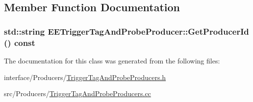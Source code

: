 \subsection{Member Function Documentation}
\hypertarget{classEETriggerTagAndProbeProducer_a57b0a6e9d0e859429865c17a679edd41}{
\subsubsection[{GetProducerId}]{\setlength{\rightskip}{0pt plus 5cm}std::string EETriggerTagAndProbeProducer::GetProducerId () const}}
\label{classEETriggerTagAndProbeProducer_a57b0a6e9d0e859429865c17a679edd41}


The documentation for this class was generated from the following files:\begin{DoxyCompactItemize}
\item 
interface/Producers/\hyperlink{TriggerTagAndProbeProducers_8h}{TriggerTagAndProbeProducers.h}\item 
src/Producers/\hyperlink{TriggerTagAndProbeProducers_8cc}{TriggerTagAndProbeProducers.cc}\end{DoxyCompactItemize}

